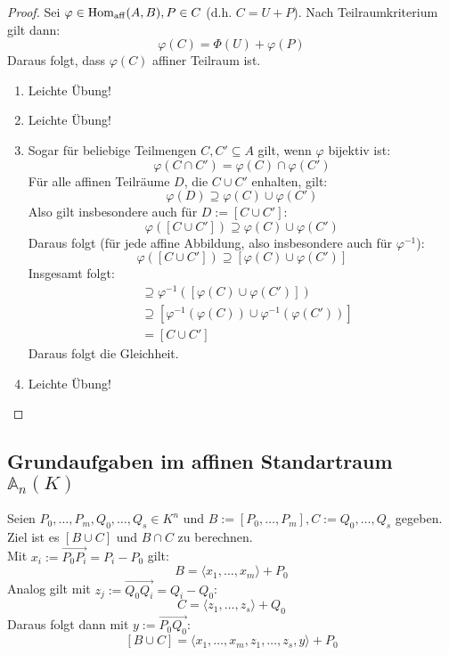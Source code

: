 \documentclass[parskip,a4paper,twoside,DIV15,BCOR12mm]{scrbook}
\begin{document}
\begin{proof}
Sei $\varphi\in\operatorname{Hom_{aff}}(A,B), P\in C$ (d.h. $C=U+P$). Nach Teilraumkriterium gilt dann:
\[\varphi(C)=\Phi(U)+\varphi(P)\]
Daraus folgt, dass $\varphi(C)$ affiner Teilraum ist.
\begin{enumerate}
\item Leichte Übung!
\item Leichte Übung!
\item Sogar für beliebige Teilmengen $C,C'\subseteq A$ gilt, wenn $\varphi$ bijektiv ist:
\[\varphi(C\cap C')=\varphi(C)\cap\varphi(C')\]
Für alle affinen Teilräume $D$, die $C\cup C'$ enhalten, gilt:
\[\varphi(D)\supseteq\varphi(C)\cup\varphi(C')\]
Also gilt insbesondere auch für $D:=[C\cup C']$:
\[\varphi([C\cup C'])\supseteq\varphi(C)\cup\varphi(C')\]
Daraus folgt (für jede affine Abbildung, also insbesondere auch für $\varphi^{-1}$):
\[\varphi([C\cup C'])\supseteq[\varphi(C)\cup\varphi(C')]\]
Insgesamt folgt:
\begin{align*}
[C\cup C']&\supseteq\varphi^{-1}([\varphi(C)\cup\varphi(C')])\\
&\supseteq[\varphi^{-1}(\varphi(C))\cup\varphi^{-1}(\varphi(C'))]\\
&= [C\cup C']
\end{align*}
Daraus folgt die Gleichheit.
\item Leichte Übung!
\end{enumerate}
\end{proof}

\subsection{Grundaufgaben im affinen Standartraum $\mathbb{A}_n(K)$}
Seien $P_0,\ldots,P_m,Q_0,\ldots,Q_s\in K^n$ und $B:=[P_0,\ldots,P_m], C:=Q_0,\ldots,Q_s$
gegeben. Ziel ist es $[B\cup C]$ und $B\cap C$ zu berechnen.\\

Mit $x_i:=\overrightarrow{P_0P_i}=P_i-P_0$ gilt:
\[B=\langle x_1,\ldots,x_m\rangle+P_0\]
Analog gilt mit $z_j:=\overrightarrow{Q_0Q_i}=Q_i-Q_0$:
\[C=\langle z_1,\ldots,z_s\rangle+Q_0\]
Daraus folgt dann mit $y:=\overrightarrow{P_0Q_0}$:
\[[B\cup C]=\langle x_1,\ldots,x_m,z_1,\ldots,z_s,y\rangle+P_0\]
\end{document}
